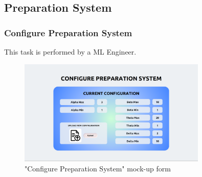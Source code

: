 \subsection{Preparation System}

\subsubsection{Configure Preparation System}

This task is performed by a ML Engineer.

\begin{figure}[H]
\centering
\includegraphics[width=0.8\textwidth]{figures/ui_configure_preparation.png}
\caption{"Configure Preparation System" mock-up form}
\end{figure}

